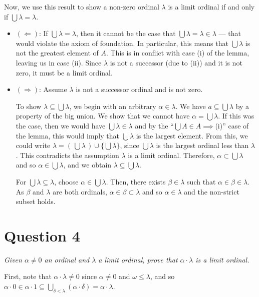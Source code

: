 \documentclass[a4paper]{article}
\begin{document}
Now, we use this result to show a non-zero ordinal $\lambda$ is a limit ordinal
if and only if $\bigcup \lambda = \lambda$.
\begin{itemize}
  \item $(\Longleftarrow)$:
    If $\bigcup \lambda = \lambda$, then it cannot be the case that $\bigcup \lambda = \lambda \in \lambda$ --- that would violate the axiom of foundation.
    In particular, this means that $\bigcup \lambda$ is not the greatest element of $A$.
    This
    is in conflict with case (i) of the lemma,
    leaving us in case (ii).
    Since $\lambda$ 
    is not a successor (due to (ii)) and it is not zero,
    it must be a limit ordinal.
  \item $(\Longrightarrow)$:
    Assume $\lambda$ is not a successor ordinal and is not zero.

    To show $\lambda \subseteq \bigcup \lambda$,
    we begin with an arbitrary $\alpha \in \lambda$.
    We have $a \subseteq \bigcup \lambda$
    by a property of the big union.
    We show that we cannot have $\alpha =  \bigcup \lambda$. 
    If this was the case, then we would have $\bigcup \lambda \in \lambda$
    and by the ``$\bigcup A \in A \implies $(i)'' case of the lemma,
    this would imply that $\bigcup \lambda$ is the largest element.
    From this, we could write
    $\lambda = (\,\bigcup \lambda\,) \cup \{\bigcup \lambda\}$,
    since $\bigcup \lambda$ is the largest ordinal less than $\lambda$.
    This contradicts the assumption $\lambda$ is a limit ordinal.
    Therefore, $\alpha \subset \bigcup \lambda$ and so $\alpha \in \bigcup \lambda$, and
    we obtain $\lambda \subseteq \bigcup \lambda$.

    For $\bigcup \lambda \subseteq \lambda$,
    choose $\alpha \in \bigcup \lambda$.
    Then, there exists $\beta \in \lambda$ such that $\alpha \in \beta \in \lambda$.
    As $\beta$ and $\lambda$ are both ordinals,
    $\alpha \in \beta \subset \lambda$ and so $\alpha \in \lambda$
    and the non-strict subset holds.








\end{itemize}



\section*{Question 4}
\begin{center}
  \textit{Given $\alpha \ne 0$ an ordinal and $\lambda$ a limit ordinal,
  prove that $\alpha \cdot \lambda$ is a limit ordinal.}
\end{center}
First, note that $\alpha \cdot \lambda \ne 0$ since
$\alpha \ne 0$ and $\omega \le \lambda$, and so
$\alpha \cdot 0 \in \alpha \cdot 1 \subseteq \bigcup_{\delta < \lambda}(\alpha \cdot \delta)=\alpha \cdot \lambda$.
\end{document}
